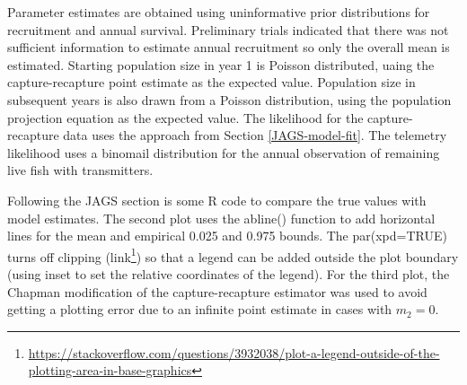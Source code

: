 \documentclass[
]{krantz}
\renewcommand{\href}[2]{#2\footnote{\url{#1}}}
\begin{document}
Parameter estimates are obtained using uninformative prior distributions for recruitment and annual survival. Preliminary trials indicated that there was not sufficient information to estimate annual recruitment so only the overall mean is estimated. Starting population size in year 1 is Poisson distributed, uaing the capture-recapture point estimate as the expected value. Population size in subsequent years is also drawn from a Poisson distribution, using the population projection equation as the expected value. The likelihood for the capture-recapture data uses the approach from Section \ref{JAGS-model-fit}. The telemetry likelihood uses a binomail distribution for the annual observation of remaining live fish with transmitters.

Following the JAGS section is some R code to compare the true values with model estimates. The second plot uses the abline() function to add horizontal lines for the mean and empirical 0.025 and 0.975 bounds. The par(xpd=TRUE) turns off clipping (\href{https://stackoverflow.com/questions/3932038/plot-a-legend-outside-of-the-plotting-area-in-base-graphics}{link}) so that a legend can be added outside the plot boundary (using inset to set the relative coordinates of the legend). For the third plot, the Chapman modification of the capture-recapture estimator \citet{ricker1975} was used to avoid getting a plotting error due to an infinite point estimate in cases with \(m_2=0\).
\end{document}
